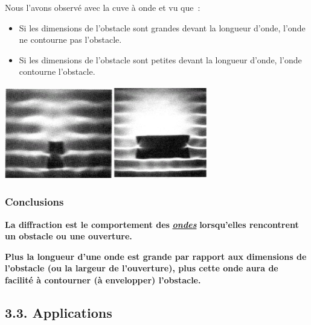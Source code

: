 Nous l'avons observé avec la cuve à onde et vu que~:

\begin{itemize}
\item  Si les dimensions de l'obstacle sont grandes devant la longueur
  d'onde, l'onde ne contourne pas l'obstacle.
\item  Si les dimensions de l'obstacle sont petites devant la longueur
  d'onde, l'onde contourne l'obstacle.
\end{itemize}

\includegraphics[width=4.731cm,height=3.974cm]{Pictures/10000001000000CC000000ABB81AAF52FD11C7D3.png}\includegraphics[width=4.128cm,height=4.046cm]{Pictures/10000001000000CD000000C9CF0691AC9C53D126.png}

\subsubsection{Conclusions}

\textbf{La diffraction est le comportement des
}\href{https://fr.wikipedia.org/wiki/Onde}{\emph{\emph{\textbf{ondes}}}}\textbf{
lorsqu'elles rencontrent un obstacle ou une ouverture. }

\textbf{Plus la longueur d'une onde est grande par rapport aux
dimensions de l'obstacle (ou la largeur de l'ouverture), plus cette onde
aura de facilité à contourner (à envelopper) l'obstacle.}
\subsection{3.3. Applications }

